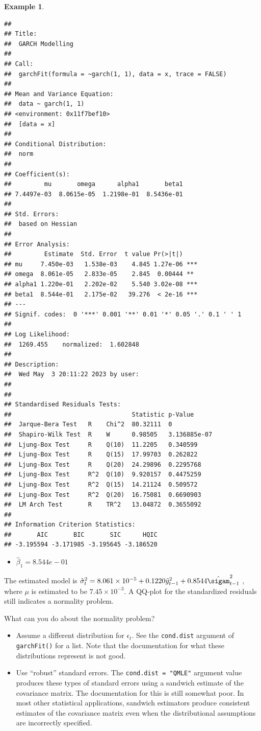 \documentclass[
]{book}
\providecommand{\tightlist}{%
  \setlength{\itemsep}{0pt}\setlength{\parskip}{0pt}}
\theoremstyle{definition}
\theoremstyle{definition}
\newtheorem{example}{Example}[chapter]
\theoremstyle{definition}
\theoremstyle{definition}
\theoremstyle{remark}
\begin{document}
\begin{example}
\begin{verbatim}
## 
## Title:
##  GARCH Modelling 
## 
## Call:
##  garchFit(formula = ~garch(1, 1), data = x, trace = FALSE) 
## 
## Mean and Variance Equation:
##  data ~ garch(1, 1)
## <environment: 0x11f7bef10>
##  [data = x]
## 
## Conditional Distribution:
##  norm 
## 
## Coefficient(s):
##         mu       omega      alpha1       beta1  
## 7.4497e-03  8.0615e-05  1.2198e-01  8.5436e-01  
## 
## Std. Errors:
##  based on Hessian 
## 
## Error Analysis:
##         Estimate  Std. Error  t value Pr(>|t|)    
## mu     7.450e-03   1.538e-03    4.845 1.27e-06 ***
## omega  8.061e-05   2.833e-05    2.845  0.00444 ** 
## alpha1 1.220e-01   2.202e-02    5.540 3.02e-08 ***
## beta1  8.544e-01   2.175e-02   39.276  < 2e-16 ***
## ---
## Signif. codes:  0 '***' 0.001 '**' 0.01 '*' 0.05 '.' 0.1 ' ' 1
## 
## Log Likelihood:
##  1269.455    normalized:  1.602848 
## 
## Description:
##  Wed May  3 20:11:22 2023 by user:  
## 
## 
## Standardised Residuals Tests:
##                                 Statistic p-Value     
##  Jarque-Bera Test   R    Chi^2  80.32111  0           
##  Shapiro-Wilk Test  R    W      0.98505   3.136885e-07
##  Ljung-Box Test     R    Q(10)  11.2205   0.340599    
##  Ljung-Box Test     R    Q(15)  17.99703  0.262822    
##  Ljung-Box Test     R    Q(20)  24.29896  0.2295768   
##  Ljung-Box Test     R^2  Q(10)  9.920157  0.4475259   
##  Ljung-Box Test     R^2  Q(15)  14.21124  0.509572    
##  Ljung-Box Test     R^2  Q(20)  16.75081  0.6690903   
##  LM Arch Test       R    TR^2   13.04872  0.3655092   
## 
## Information Criterion Statistics:
##       AIC       BIC       SIC      HQIC 
## -3.195594 -3.171985 -3.195645 -3.186520
\end{verbatim}

\begin{itemize}
\tightlist
\item
  \(\hat \beta_1=8.544e-01\)
\end{itemize}

The estimated model is \(\hat \sigma_t^2= 8.061\times 10^{-5} + 0.1220\tilde y^2_{t-1} + 0.8544\hat \sigam^2_{t-1}\) , where \(\mu\) is estimated to be \(7.45\times 10^{-3}\). A QQ-plot for the standardized residuals still indicates a normality problem.
\end{example}

What can you do about the normality problem?

\begin{itemize}
\tightlist
\item
  Assume a different distribution for \(\epsilon_t\). See the \texttt{cond.dist} argument of \texttt{garchFit()} for a list. Note that the documentation for what these distributions represent is not good.
\item
  Use ``robust'' standard errors. The \texttt{cond.dist\ =\ "QMLE"} argument value produces these types of standard errors using a sandwich estimate of the covariance matrix. The documentation for this is still somewhat poor. In most other statistical applications, sandwich estimators produce consistent estimates of the covariance matrix even when the distributional assumptions are incorrectly specified.
\end{itemize}
\end{document}
